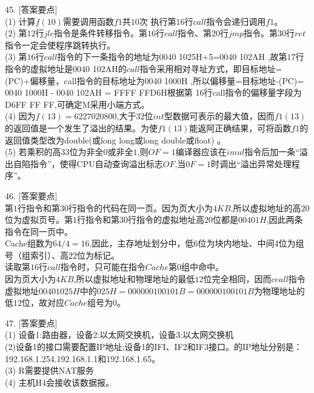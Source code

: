 45. [答案要点] \\
(1) 计算$f(10)$需要调用函数$f1$共$10$次 执行第$16$行$call$指令会递归调用$f1$。 \\
(2) 第$12$行$jle$指令是条件转移指令。第$16$行$call$指令、第$20$行$jmp$指令。第$30$行$ret$指令一定会使程序跳转执行。 \\
(3) 第$16$行$call$指令的下一条指令的地址为0040 1025H+5=0040 102AH ,故第$17$行指令的虚拟地址是0040 102AH的$call$指令采用相对寻址方式，即目标地址=(PC)+偏移量，call指令的目标地址为0040 1000H ,所以偏移量=目标地址-(PC)= 0040 1000H - 0040 102AH = FFFF FFD6H根据第 16行call指令的偏移量字段为D6FF FF FF,可确定M采用小端方式。 \\
(4) 因为$f(13) = 6 227020 800$,大于$32$位$int$型数据可表示的最大值，因而$f1(13)$的返回值是一个发生了溢出的结果。为使$f1(13)$能返阿正确结果，可将函数$f1$的返回值类型改为double(或long long或long double或float) 。 \\
(5) 若乘积的高$33$位为非全$0$或非全$1$,则$OF=1$编译器应该在$imul$指令后加一条“溢出自陷指令”，使得CPU自动查询溢出标志$OF$,当$0F=1$时调出“溢出异常处理程序”。

46. [答案要点] \\
第$1$行指令和第$30$行指令的代码在同一页。因为页大小为$4 KB$,所以虚拟地址的高$20$位为虚拟页号。第$1$行指令和第$30$行指令的虚拟地址高$20$位都是$00401H$,因此两条指令在同一页中。 \\
Cache组数为$64/4=16$,因此，主存地址划分中，低$6$位为块内地址、中间4位为组号（组索引）、高$22$位为标记。 \\
读取第$16$行$call$指令时，只可能在指令$Cache$第$0$组中命中。 \\
因为页大小为$4KB$,所以虚拟地址和物理地址的最低$12$位完全相同，因而$ceall$指令虚拟地址$00401025H$中的$025H=000000100101B=000000100101B$为物理地址的低$12$位，故对应$Cache$组号为$0$。

47. [答案要点] \\
(1) 设备1:路由器，设备2:以太网交换机，设备3:以太网交换机 \\
(2)设备1的接口需要配置IP地址;设备1的IFI、IF2和IF3接口。的IP地址分别是：192.168.1.254.192.168.1.1和192.168.1.65。 \\
(3) R需要提供NAT服务 \\
(4) 主机H4会接收该数据报。
